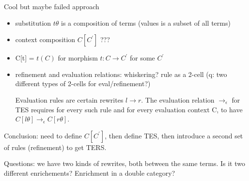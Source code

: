 \documentclass{article}
\theoremstyle{plain}
\theoremstyle{definition}
\begin{document}
\begin{section}{Cool but maybe failed approach}
\begin{itemize}
    \item substitution $t\theta$ is a composition of terms (values is a subset of all terms)
    \item {\color{red} context composition $C[C^{'}]$ ???}
    \item C[t] = $t(C)$ for morphism $t: C \rightarrow C^
    {'}$ for some $C^{'}$
    \item refinement and evaluation relations: whiskering? rule as a 2-cell (q: two different types of 2-cells for eval/refinement?)

Evaluation rules are certain rewrites $l \rightarrow r$. The evaluation relation $\rightarrow_{\epsilon}$ for TES requires for every such rule and for every evaluation context C, to have $C[l\theta] \rightarrow_{\epsilon} C[r\theta]$. 
\end{itemize}

Conclusion: need to define $C[C^{'}]$, then define TES, then introduce a second set of rules (refinement) to get TERS.

Questions: we have two kinds of rewrites, both between the same terms. Is it two different enrichements? 
Enrichment in a double category?

\end{section}
\end{document}
